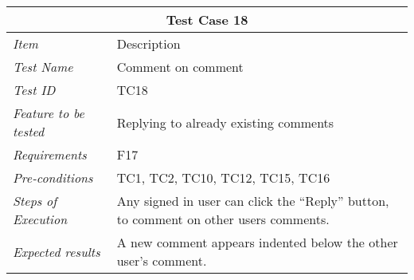 \documentclass[11pt]{report}
\begin{document}
%
\begin{minipage}{\linewidth}
\setlength{\tabcolsep}{15pt}
\centering
{}
\begin{tabular}{ |l|p{70mm}| }
	\hline
	\multicolumn{2}{|c|}{\cellcolor{gray!25} \textbf{Test Case 18}} \\
	\hline
	\it{\cellcolor{gray!25}Item} & {\cellcolor{gray!25} Description } \\
	\hline
	\it{\cellcolor{gray!25}Test Name } & Comment on comment \\ \hline
	\it{\cellcolor{gray!25}Test ID} & TC18 \\ \hline
	\it{\cellcolor{gray!25}Feature to be tested} & Replying to already existing comments \\ \hline
	\it{\cellcolor{gray!25}Requirements} & F17 \\ \hline
	\it{\cellcolor{gray!25}Pre-conditions} & TC1, TC2, TC10, TC12, TC15, TC16 \\ \hline
	\it{\cellcolor{gray!25}Steps of Execution} & Any signed in user can click the ``Reply'' button, to comment on other users comments.  \\ \hline
	\it{\cellcolor{gray!25}Expected results} & A new comment appears indented below the other user's comment.  \\
	\hline
\end{tabular}
\medskip
\end{minipage}
\end{document}
